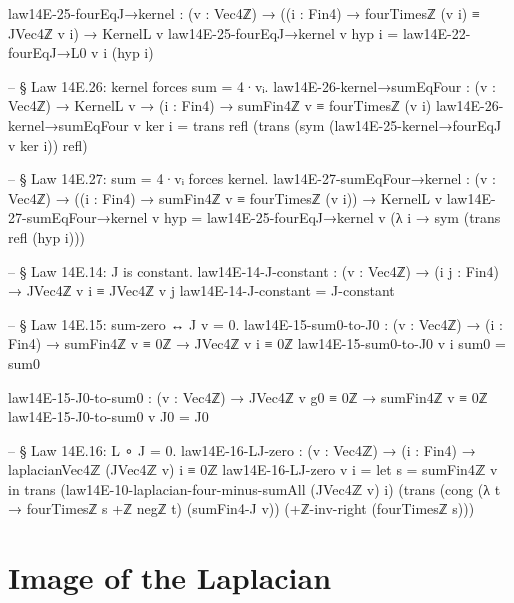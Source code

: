 \documentclass[11pt,a4paper]{book}
\begin{document}
\begin{code}
law14E-25-fourEqJ→kernel : (v : Vec4ℤ) → ((i : Fin4) → fourTimesℤ (v i) ≡ JVec4ℤ v i) → KernelL v
law14E-25-fourEqJ→kernel v hyp i = law14E-22-fourEqJ→L0 v i (hyp i)

-- § Law 14E.26: kernel forces sum = 4·vᵢ.
law14E-26-kernel→sumEqFour : (v : Vec4ℤ) → KernelL v → (i : Fin4) →
  sumFin4ℤ v ≡ fourTimesℤ (v i)
law14E-26-kernel→sumEqFour v ker i =
  trans
    refl
    (trans
      (sym (law14E-25-kernel→fourEqJ v ker i))
      refl)

-- § Law 14E.27: sum = 4·vᵢ forces kernel.
law14E-27-sumEqFour→kernel : (v : Vec4ℤ) → ((i : Fin4) → sumFin4ℤ v ≡ fourTimesℤ (v i)) → KernelL v
law14E-27-sumEqFour→kernel v hyp =
  law14E-25-fourEqJ→kernel v (λ i → sym (trans refl (hyp i)))

-- § Law 14E.14: J is constant.
law14E-14-J-constant : (v : Vec4ℤ) → (i j : Fin4) →
  JVec4ℤ v i ≡ JVec4ℤ v j
law14E-14-J-constant = J-constant

-- § Law 14E.15: sum-zero ↔ J v = 0.
law14E-15-sum0-to-J0 : (v : Vec4ℤ) → (i : Fin4) → sumFin4ℤ v ≡ 0ℤ →
  JVec4ℤ v i ≡ 0ℤ
law14E-15-sum0-to-J0 v i sum0 = sum0

law14E-15-J0-to-sum0 : (v : Vec4ℤ) → JVec4ℤ v g0 ≡ 0ℤ →
  sumFin4ℤ v ≡ 0ℤ
law14E-15-J0-to-sum0 v J0 = J0

-- § Law 14E.16: L ∘ J = 0.
law14E-16-LJ-zero : (v : Vec4ℤ) → (i : Fin4) →
  laplacianVec4ℤ (JVec4ℤ v) i ≡ 0ℤ
law14E-16-LJ-zero v i =
  let s = sumFin4ℤ v in
  trans
    (law14E-10-laplacian-four-minus-sumAll (JVec4ℤ v) i)
    (trans
      (cong (λ t → fourTimesℤ s +ℤ negℤ t) (sumFin4-J v))
      (+ℤ-inv-right (fourTimesℤ s)))
\end{code}

\section{Image of the Laplacian}
\end{document}

